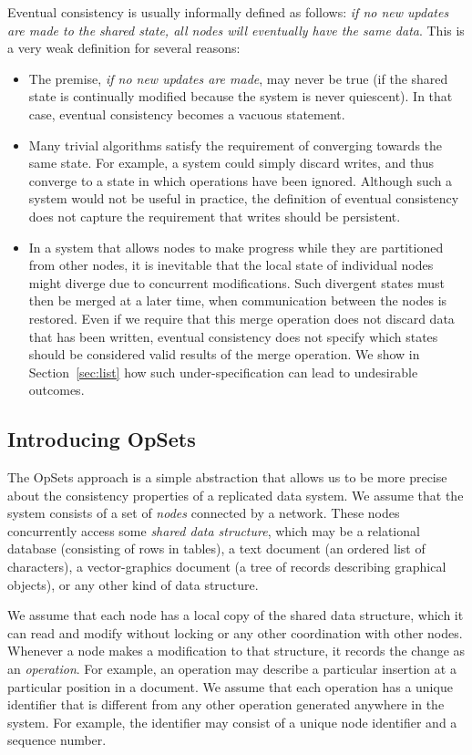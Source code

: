 Eventual consistency is usually informally defined as follows: \emph{if no new updates are made to the shared state, all nodes will eventually have the same data}.
This is a very weak definition for several reasons:
\begin{itemize}
\item The premise, \emph{if no new updates are made}, may never be true (if the shared state is continually modified because the system is never quiescent).
In that case, eventual consistency becomes a vacuous statement.

\item Many trivial algorithms satisfy the requirement of converging towards the same state.
For example, a system could simply discard writes, and thus converge to a state in which operations have been ignored.
Although such a system would not be useful in practice, the definition of eventual consistency does not capture the requirement that writes should be persistent.

\item In a system that allows nodes to make progress while they are partitioned from other nodes, it is inevitable that the local state of individual nodes might diverge due to concurrent modifications.
Such divergent states must then be merged at a later time, when communication between the nodes is restored.
Even if we require that this merge operation does not discard data that has been written, eventual consistency does not specify which states should be considered valid results of the merge operation.
We show in Section~\ref{sec:list} how such under-specification can lead to undesirable outcomes.
\end{itemize}

\subsection{Introducing OpSets}\label{sec:opsets-intro}

The OpSets approach is a simple abstraction that allows us to be more precise about the consistency properties of a replicated data system.
We assume that the system consists of a set of \emph{nodes} connected by a network.
These nodes concurrently access some \emph{shared data structure}, which may be a relational database (consisting of rows in tables), a text document (an ordered list of characters), a vector-graphics document (a tree of records describing graphical objects), or any other kind of data structure.

We assume that each node has a local copy of the shared data structure, which it can read and modify without locking or any other coordination with other nodes.
Whenever a node makes a modification to that structure, it records the change as an \emph{operation}.
For example, an operation may describe a particular insertion at a particular position in a document.
We assume that each operation has a unique identifier that is different from any other operation generated anywhere in the system.
For example, the identifier may consist of a unique node identifier and a sequence number.

